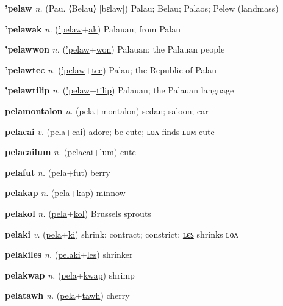 \textbf{\hypertarget{'pelaw}{'pelaw}} \textit{n.} (Pau. ⟨Belau⟩ [bɛlaw])
Palau; Belau; Palaos; Pelew (landmass)

\textbf{\hypertarget{'pelawak}{'pelawak}} \textit{n.} (\hyperlink{'pelaw}{'pelaw}+\allowbreak \hyperlink{ak}{ak})
Palauan; from Palau

\textbf{\hypertarget{'pelawwon}{'pelawwon}} \textit{n.} (\hyperlink{'pelaw}{'pelaw}+\allowbreak \hyperlink{won}{won})
Palauan; the Palauan people

\textbf{\hypertarget{'pelawtec}{'pelawtec}} \textit{n.} (\hyperlink{'pelaw}{'pelaw}+\allowbreak \hyperlink{tec}{tec})
Palau; the Republic of Palau

\textbf{\hypertarget{'pelawtilip}{'pelawtilip}} \textit{n.} (\hyperlink{'pelaw}{'pelaw}+\allowbreak \hyperlink{tilip}{tilip})
Palauan; the Palauan language

\textbf{\hypertarget{pelamontalon}{pelamontalon}} \textit{n.} (\hyperlink{pela}{pela}+\allowbreak \hyperlink{montalon}{montalon})
sedan; saloon; car

\textbf{\hypertarget{pelacai}{pelacai}} \textit{v.} (\hyperlink{pela}{pela}+\allowbreak \hyperlink{cai}{cai})
adore; be cute; ʟᴏᴧ finds \hyperlink{pelacailum}{ʟᴜᴍ} cute

\textbf{\hypertarget{pelacailum}{pelacailum}} \textit{n.} (\hyperlink{pelacai}{pelacai}+\allowbreak \hyperlink{lum}{lum})
cute

\textbf{\hypertarget{pelafut}{pelafut}} \textit{n.} (\hyperlink{pela}{pela}+\allowbreak \hyperlink{fut}{fut})
berry

\textbf{\hypertarget{pelakap}{pelakap}} \textit{n.} (\hyperlink{pela}{pela}+\allowbreak \hyperlink{kap}{kap})
minnow

\textbf{\hypertarget{pelakol}{pelakol}} \textit{n.} (\hyperlink{pela}{pela}+\allowbreak \hyperlink{kol}{kol})
Brussels sprouts

\textbf{\hypertarget{pelaki}{pelaki}} \textit{v.} (\hyperlink{pela}{pela}+\allowbreak \hyperlink{ki}{ki})
shrink; contract; constrict; \hyperlink{pelakiles}{ʟєꜱ} shrinks ʟᴏᴧ

\textbf{\hypertarget{pelakiles}{pelakiles}} \textit{n.} (\hyperlink{pelaki}{pelaki}+\allowbreak \hyperlink{les}{les})
shrinker

\textbf{\hypertarget{pelakwap}{pelakwap}} \textit{n.} (\hyperlink{pela}{pela}+\allowbreak \hyperlink{kwap}{kwap})
shrimp

\textbf{\hypertarget{pelatawh}{pelatawh}} \textit{n.} (\hyperlink{pela}{pela}+\allowbreak \hyperlink{tawh}{tawh})
cherry

